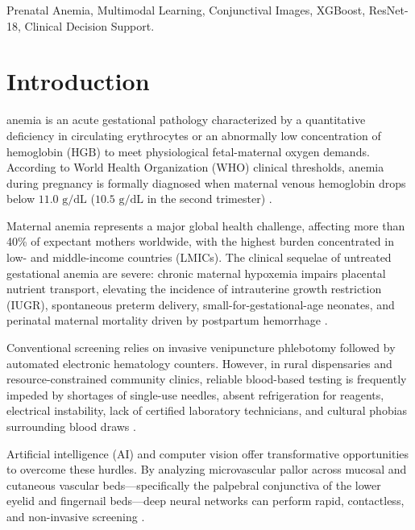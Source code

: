 \documentclass[journal,10pt,twocolumn]{IEEEtran}
\begin{document}
\begin{IEEEkeywords}
Prenatal Anemia, Multimodal Learning, Conjunctival Images, XGBoost, ResNet-18, Clinical Decision Support.
\end{IEEEkeywords}

\section{Introduction}
 anemia is an acute gestational pathology characterized by a quantitative deficiency in circulating erythrocytes or an abnormally low concentration of hemoglobin ($\text{HGB}$) to meet physiological fetal-maternal oxygen demands. According to World Health Organization (WHO) clinical thresholds, anemia during pregnancy is formally diagnosed when maternal venous hemoglobin drops below $11.0\text{ g/dL}$ ($10.5\text{ g/dL}$ in the second trimester) \cite{ethiopian_dhs2024, taye2026machine}. 

Maternal anemia represents a major global health challenge, affecting more than 40\% of expectant mothers worldwide, with the highest burden concentrated in low- and middle-income countries (LMICs). The clinical sequelae of untreated gestational anemia are severe: chronic maternal hypoxemia impairs placental nutrient transport, elevating the incidence of intrauterine growth restriction (IUGR), spontaneous preterm delivery, small-for-gestational-age neonates, and perinatal maternal mortality driven by postpartum hemorrhage \cite{scirep2024postdelivery}.

Conventional screening relies on invasive venipuncture phlebotomy followed by automated electronic hematology counters. However, in rural dispensaries and resource-constrained community clinics, reliable blood-based testing is frequently impeded by shortages of single-use needles, absent refrigeration for reagents, electrical instability, lack of certified laboratory technicians, and cultural phobias surrounding blood draws \cite{kato2024hemoglobin, ijmr2026inflammation}.

Artificial intelligence (AI) and computer vision offer transformative opportunities to overcome these hurdles. By analyzing microvascular pallor across mucosal and cutaneous vascular beds—specifically the palpebral conjunctiva of the lower eyelid and fingernail beds—deep neural networks can perform rapid, contactless, and non-invasive screening \cite{conjunctiva2023detection, vit_conjunctiva2025}. 
\end{document}
